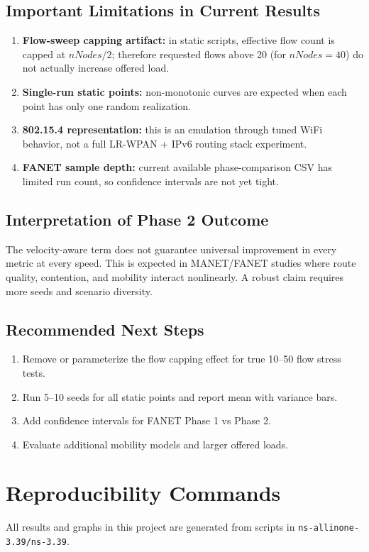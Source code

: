 \documentclass[12pt,a4paper]{article}
\begin{document}
\subsection{Important Limitations in Current Results}
\begin{enumerate}[leftmargin=1.5em]
    \item \textbf{Flow-sweep capping artifact:} in static scripts, effective flow count is capped at $nNodes/2$; therefore requested flows above 20 (for $nNodes=40$) do not actually increase offered load.
    \item \textbf{Single-run static points:} non-monotonic curves are expected when each point has only one random realization.
    \item \textbf{802.15.4 representation:} this is an emulation through tuned WiFi behavior, not a full LR-WPAN + IPv6 routing stack experiment.
    \item \textbf{FANET sample depth:} current available phase-comparison CSV has limited run count, so confidence intervals are not yet tight.
\end{enumerate}

\subsection{Interpretation of Phase 2 Outcome}
The velocity-aware term does not guarantee universal improvement in every metric at every speed. This is expected in MANET/FANET studies where route quality, contention, and mobility interact nonlinearly. A robust claim requires more seeds and scenario diversity.

\subsection{Recommended Next Steps}
\begin{enumerate}[leftmargin=1.5em]
    \item Remove or parameterize the flow capping effect for true 10--50 flow stress tests.
    \item Run 5--10 seeds for all static points and report mean with variance bars.
    \item Add confidence intervals for FANET Phase 1 vs Phase 2.
    \item Evaluate additional mobility models and larger offered loads.
\end{enumerate}

\section{Reproducibility Commands}
All results and graphs in this project are generated from scripts in \texttt{ns-allinone-3.39/ns-3.39}.
\end{document}
